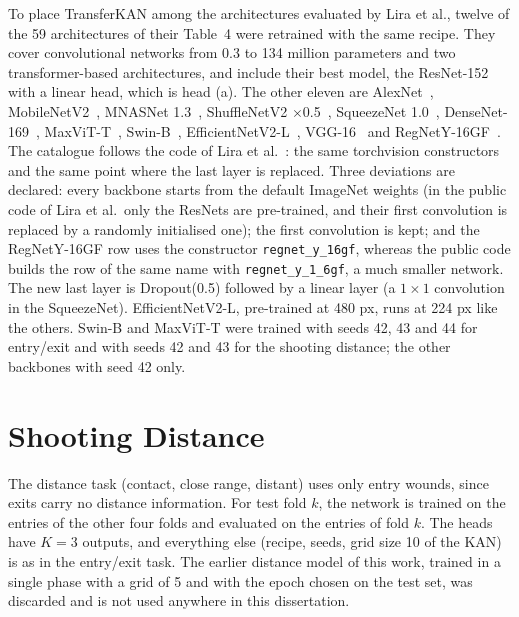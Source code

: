 To place TransferKAN among the architectures evaluated by Lira et al., twelve of the 59 architectures of their Table~4 were retrained with the same recipe. They cover convolutional networks from 0.3 to 134 million parameters and two transformer-based architectures, and include their best model, the ResNet-152~\cite{he2016resnet} with a linear head, which is head (a). The other eleven are AlexNet~\cite{krizhevsky2012alexnet}, MobileNetV2~\cite{sandler2018mobilenetv2}, MNASNet 1.3~\cite{tan2019mnasnet}, ShuffleNetV2 $\times$0.5~\cite{ma2018shufflenetv2}, SqueezeNet 1.0~\cite{iandola2016squeezenet}, DenseNet-169~\cite{huang2017densenet}, MaxViT-T~\cite{tu2022maxvit}, Swin-B~\cite{liu2021swin}, EfficientNetV2-L~\cite{tan2021efficientnetv2}, VGG-16~\cite{simonyan2015vgg} and RegNetY-16GF~\cite{radosavovic2020regnet}. The catalogue follows the code of Lira et al.~\cite{leguwoi}: the same torchvision constructors and the same point where the last layer is replaced. Three deviations are declared: every backbone starts from the default ImageNet weights (in the public code of Lira et al.\ only the ResNets are pre-trained, and their first convolution is replaced by a randomly initialised one); the first convolution is kept; and the RegNetY-16GF row uses the constructor \texttt{regnet\_y\_16gf}, whereas the public code builds the row of the same name with \texttt{regnet\_y\_1\_6gf}, a much smaller network. The new last layer is Dropout(0.5) followed by a linear layer (a $1 \times 1$ convolution in the SqueezeNet). EfficientNetV2-L, pre-trained at 480 px, runs at 224 px like the others. Swin-B and MaxViT-T were trained with seeds 42, 43 and 44 for entry/exit and with seeds 42 and 43 for the shooting distance; the other backbones with seed 42 only.

\section{Shooting Distance}
\label{sec:mlsd_setup}

The distance task (contact, close range, distant) uses only entry wounds, since exits carry no distance information. For test fold $k$, the network is trained on the entries of the other four folds and evaluated on the entries of fold $k$. The heads have $K=3$ outputs, and everything else (recipe, seeds, grid size 10 of the KAN) is as in the entry/exit task. The earlier distance model of this work, trained in a single phase with a grid of 5 and with the epoch chosen on the test set, was discarded and is not used anywhere in this dissertation.

